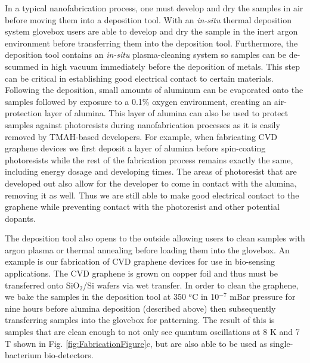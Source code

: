 In a typical nanofabrication process, one must develop and dry the samples in air before moving them into a deposition tool. With an \textit{in-situ} thermal deposition system glovebox users are able to develop and dry the sample in the inert argon environment before transferring them into the deposition tool. Furthermore, the deposition tool contains an \textit{in-situ} plasma-cleaning system so samples can be de-scummed in high vacuum immediately before the deposition of metals. This step can be critical in establishing good electrical contact to certain materials. Following the deposition, small amounts of aluminum can be evaporated onto the samples followed by exposure to a 0.1\% oxygen environment, creating an air-protection layer of alumina.\cite{Damasco2019tunnel} This layer of alumina can also be used to protect samples against photoresists during nanofabrication processes as it is easily removed by TMAH-based developers. For example, when fabricating CVD graphene devices we first deposit a layer of alumina before spin-coating photoresists while the rest of the fabrication process remains exactly the same, including energy dosage and developing times. The areas of photoresist that are developed out also allow for the developer to come in contact with the alumina, removing it as well. Thus we are still able to make good electrical contact to the graphene while preventing contact with the photoresist and other potential dopants.

The deposition tool also opens to the outside allowing users to clean samples with argon plasma or thermal annealing before loading them into the glovebox. An example is our fabrication of CVD graphene devices for use in bio-sensing applications. The CVD graphene is grown on copper foil and thus must be transferred onto SiO$_{2}$/Si wafers via wet transfer.\cite{doi:10.1021/acsnano.6b04110} In order to clean the graphene, we bake the samples in the deposition tool at 350 $^{o}$C in 10$^{-7}$ mBar pressure for nine hours before alumina deposition (described above) then subsequently transferring samples into the glovebox for patterning. The result of this is samples that are clean enough to not only see quantum oscillations at 8 K and 7 T shown in Fig. \ref{fig:FabricationFigure}c, but are also able to be used as single-bacterium bio-detectors.\cite{KUMAR2020112123}

